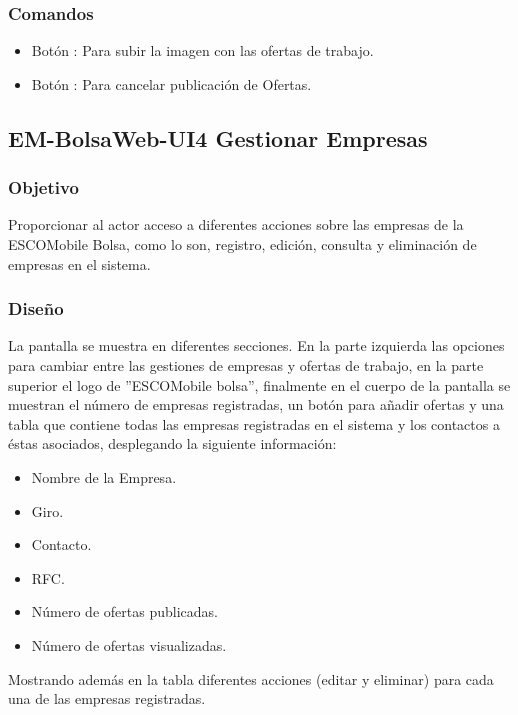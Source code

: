 \subsubsection{Comandos}
 	\begin{itemize}
		\item Botón : Para subir la imagen con las ofertas de trabajo.  
		\item Botón : Para cancelar publicación de Ofertas.

	\end{itemize}









					



\subsection{EM-BolsaWeb-UI4 Gestionar Empresas}

\subsubsection{Objetivo}
	\noindent
	Proporcionar al actor acceso a diferentes acciones sobre las empresas de la ESCOMobile Bolsa, como lo son, registro, edición, consulta y eliminación de empresas en el sistema. 

\subsubsection{Diseño}
	\noindent
	La pantalla se muestra en diferentes secciones. En la parte izquierda las opciones para cambiar entre las gestiones de empresas y ofertas de trabajo, en la parte superior el logo de ''ESCOMobile bolsa'', finalmente en el cuerpo de la pantalla se muestran el número de empresas registradas, un botón para añadir ofertas y una tabla que contiene todas las empresas registradas en el sistema y los contactos a éstas asociados, desplegando la siguiente información:
	\begin{itemize}
		\item Nombre de la Empresa.
		\item Giro.
		\item Contacto.
		\item RFC.
		\item Número de ofertas publicadas.
		\item Número de ofertas visualizadas. 
	\end{itemize}
	Mostrando además en la tabla diferentes acciones (editar y eliminar) para cada una de las empresas registradas.

